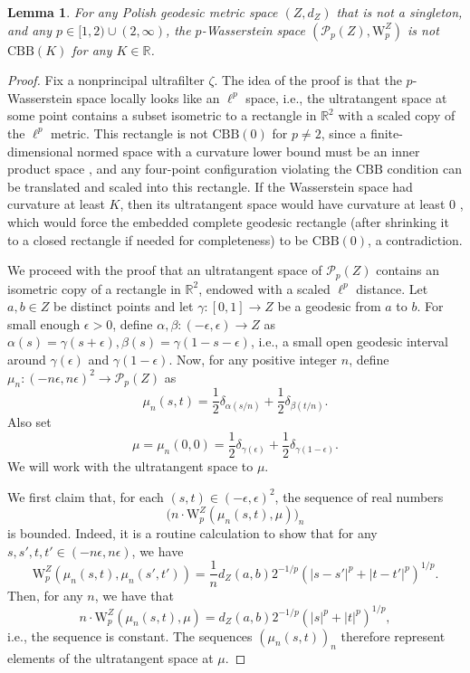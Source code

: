 \documentclass{article}
\newtheorem{lemma}[proposition]{Lemma}
\theoremstyle{definition}
\newcommand{\R}{\mathbb{R}}
\newcommand{\WZ}{\mathcal{P}_p(Z)}
\newcommand{\wz}{\mathrm{W}_p^Z}
\begin{document}
\begin{lemma}
    \label{lem:Wasserstein_curvature_pneq2}
    For any Polish geodesic metric space $(Z, d_Z)$ that is not a singleton, and any $p \in [1,2) \cup (2,\infty)$, the $p$-Wasserstein space $(\WZ, \wz)$  is not $\mathrm{CBB}(K)$ for any $K\in \mathbb{R}$.
\end{lemma}

\begin{proof}
    Fix a nonprincipal ultrafilter $\zeta$. The idea of the proof is that the $p$-Wasserstein space locally looks like an $\ell^p$ space, i.e., the ultratangent space at some point contains a subset isometric to a rectangle in $\mathbb{R}^2$ with a scaled copy of the $\ell^p$ metric. This rectangle is not $\mathrm{CBB}(0)$ for $p\neq 2$, since a finite-dimensional normed space with a curvature lower bound must be an inner product space \cite[Proposition 1.8]{sturm1999metric}, and any four-point configuration violating the $\mathrm{CBB}$ condition can be translated and scaled into this rectangle. If the Wasserstein space had curvature at least $K$,
    then its ultratangent space would have curvature at least $0$
    \cite[Theorem 13.1(a)]{alexander2024alexandrov}, which would force the
    embedded complete geodesic rectangle (after shrinking it to a closed rectangle if needed for completeness) to be $\mathrm{CBB}(0)$, a
    contradiction.

    We proceed with the proof that an ultratangent space of $\WZ$ contains an isometric copy of a rectangle in $\R^2$, endowed with a scaled  $\ell^p$ distance. Let $a, b \in Z$ be distinct points and let $\gamma:[0, 1] \to Z$ be a geodesic from $a$ to $b$. For small enough $\epsilon>0$, define $\alpha, \beta : (-\epsilon, \epsilon) \to Z$ as $\alpha(s) = \gamma(s + \epsilon), \beta(s) = \gamma(1 - s - \epsilon)$, i.e., a small open geodesic interval around $\gamma(\epsilon)$ and $\gamma(1-\epsilon)$. Now, for any positive integer $n$, define $\mu_n: (-n\epsilon, n\epsilon)^2 \to \WZ$ as 
    \begin{equation}
        \mu_n(s, t) = \frac{1}{2}\delta_{\alpha(s/n)} + \frac{1}{2}\delta_{\beta(t/n)}.
    \end{equation} 
    Also set 
    \[
    \mu = \mu_n(0,0) = \frac{1}{2} \delta_{\gamma(\epsilon)} + \frac{1}{2} \delta_{\gamma(1-\epsilon)}.
    \]
    We will work with the ultratangent space to $\mu$. 

    We first claim that, for each $(s,t) \in (-\epsilon,\epsilon)^2$, the sequence of real numbers
    \[
    \big(n \cdot \wz(\mu_n(s,t),\mu)\big)_n
    \]
    is bounded. Indeed, it is a routine calculation to show that for any $s, s', t, t' \in (-n\epsilon, n\epsilon)$, we have
    \begin{equation}
        \label{eqn:Wasserstein_lp_distance}
        \wz(\mu_n(s, t), \mu_n(s', t')) = \frac{1}{n}d_Z(a, b) 2^{-1/p}\left(|s-s'|^p + |t - t'|^p\right)^{1/p}.
    \end{equation}
    Then, for any $n$, we have that
    \[
    n \cdot \wz(\mu_n(s,t),\mu) = d_Z(a, b) 2^{-1/p}\left(|s|^p + |t|^p\right)^{1/p},
    \]
    i.e., the sequence is constant. The sequences $(\mu_n(s,t))_n$ therefore represent elements of the ultratangent space at $\mu$. 


\end{proof}
\end{document}
